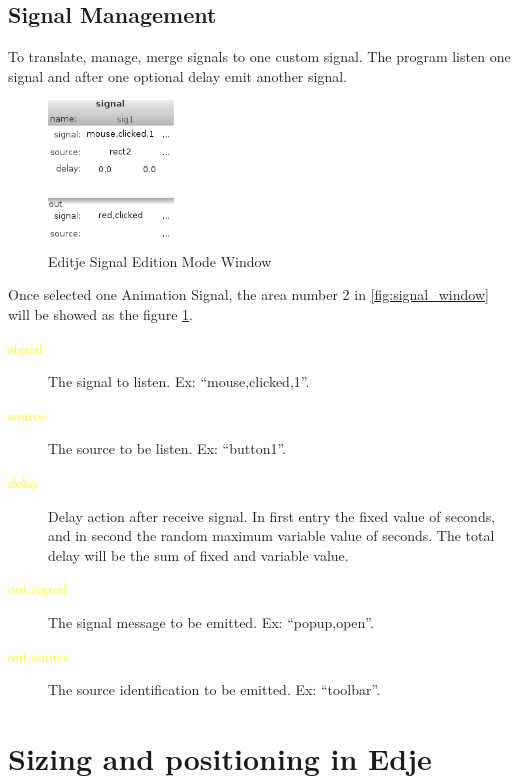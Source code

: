 \documentclass[a4paper]{profusion}
\newcommand{\GUIEditable}[1]{\textcolor{yellow}{#1}} %
\begin{document}
\subsection{Signal Management}
\label{sec:signal_editing_signal}

	To translate, manage, merge signals to one custom signal. The
program listen one signal and after one optional delay emit another signal.

\begin{figure}
 \centering
 \includegraphics[width=0.3\textwidth]{./images/signal_signal.png}
 \caption{Editje Signal Edition Mode Window}
 \label{fig:signal_signal_edition}
\end{figure}


	Once selected one Animation Signal, the area number 2 in
\ref{fig:signal_window} will be showed as the figure
\ref{fig:signal_signal_edition}.

\begin{description}
 \item[\GUIEditable{signal}] The signal to listen. Ex:
   ``mouse,clicked,1''.
 \item[\GUIEditable{source}] The source to be listen. Ex: ``button1''.
 \item[\GUIEditable{delay}] Delay action after receive signal. In
   first entry the fixed value of seconds, and in second the random
   maximum variable value of seconds.  The total delay will be the sum
   of fixed and variable value.
 \item[\GUIEditable{out.signal}] The signal message to be emitted. Ex:
   ``popup,open''.
 \item[\GUIEditable{out.source}] The source identification to be
   emitted. Ex: ``toolbar''.
\end{description}

\newpage
\appendix
\section{Sizing and positioning in Edje}
\label{app:edje_pos}
\end{document}
